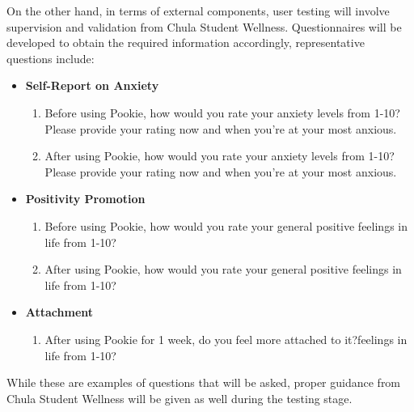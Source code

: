 On the other hand, in terms of external components, user testing will involve supervision and validation from Chula Student Wellness. Questionnaires will be developed to obtain the required information accordingly, representative questions include:

\begin{itemize}
    \item \textbf{Self-Report on Anxiety}
    \begin{enumerate}
        \item Before using Pookie, how would you rate your anxiety levels from 1-10? Please provide your rating now and when you’re at your most anxious.
        \item After using Pookie, how would you rate your anxiety levels from 1-10? Please provide your rating now and when you’re at your most anxious.
    \end{enumerate}
    \item \textbf{Positivity Promotion}
    \begin{enumerate}
        \item Before using Pookie, how would you rate your general positive feelings in life from 1-10?
        \item After using Pookie, how would you rate your general positive feelings in life from 1-10?
    \end{enumerate}
    \item \textbf{Attachment}
    \begin{enumerate}
        \item After using Pookie for 1 week, do you feel more attached to it?feelings in life from 1-10?
    \end{enumerate}
\end{itemize}

While these are examples of questions that will be asked, proper guidance from Chula Student Wellness will be given as well during the testing stage.